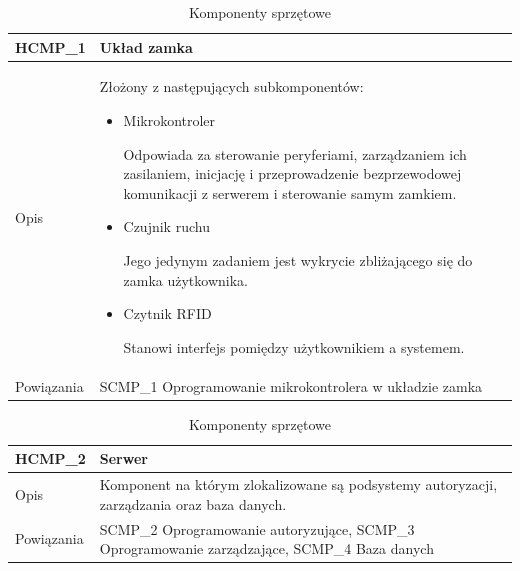                 \begin{table}
                    \caption{Komponenty sprzętowe}
                    \centering
                    \begin{subtable}[c]{\textwidth}
                        \centering
                        \begin{tabular}{p{2cm}|p{12cm}}
                            HCMP\_1      & \textbf{Układ zamka} \\
                            \hline Opis         & Złożony z następujących subkomponentów:
                                                    \begin{itemize}
                                                        \item Mikrokontroler

                                                            Odpowiada za sterowanie peryferiami, zarządzaniem ich zasilaniem, inicjację i przeprowadzenie bezprzewodowej komunikacji z serwerem i sterowanie samym zamkiem.

                                                        \item Czujnik ruchu

                                                            Jego jedynym zadaniem jest wykrycie zbliżającego się do zamka użytkownika.

                                                        \item Czytnik RFID

                                                            Stanowi interfejs pomiędzy użytkownikiem a systemem.
                                                    \end{itemize}  \\
                            \hline Powiązania   & SCMP\_1 Oprogramowanie mikrokontrolera w układzie zamka    \\
                        \end{tabular}
                        \label{tbl:hcmp1}
                        \vspace{10mm}           
                    \end{subtable}
                \quad%
                    \begin{subtable}[c]{\textwidth}
                        \centering
                        \begin{tabular}{p{2cm}|p{12cm}}
                            HCMP\_2      & \textbf{Serwer} \\
                            \hline Opis         & Komponent na którym zlokalizowane są podsystemy autoryzacji, zarządzania oraz baza danych.  \\
                            \hline Powiązania   & SCMP\_2 Oprogramowanie autoryzujące, SCMP\_3 Oprogramowanie zarządzające, SCMP\_4 Baza danych   \\
                        \end{tabular}
                        \label{tbl:hcmp2}     
                    \end{subtable}                
                    \label{tbl:hw_comp}
                \end{table}

